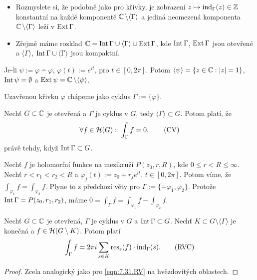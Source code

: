 \begin{note}
\begin{itemize}
    \item Rozmyslete si, že podobně jako pro křivky, je zobrazení $z\mapsto\operatorname{ind}_\Gamma(z)\in\operatorname{\mathbb{Z}}$ konstantní na každé komponentě $\operatorname{\mathbb{C}} \setminus\langle\Gamma\rangle$ a jediná neomezená komponenta $\operatorname{\mathbb{C}} \setminus\langle\Gamma\rangle$ leží v $\operatorname{Ext}\Gamma$.
    \item Zřejmě máme rozklad $\operatorname{\mathbb{C}} =\operatorname{Int}\Gamma\cup\langle\Gamma\rangle\cup\operatorname{Ext} \Gamma$, kde $\operatorname{Int} \Gamma$, $\operatorname{Ext} \Gamma$ jsou otevřené a $\langle\Gamma\rangle$, $\operatorname{Int} \Gamma\cup\langle\Gamma\rangle$ jsou kompaktní.
\end{itemize}
\end{note}

\begin{example}
Je-li $\psi:=\varphi\dotminus\varphi$, $\varphi(t):=e^{it}$, pro $t\in[0,2\pi]$. Potom $\langle\psi\rangle=\{z\in\operatorname{\mathbb{C}} : |z|=1\}$, $\operatorname{Int}\psi=\emptyset$ a $\operatorname{Ext}\psi=\operatorname{\mathbb{C}} \setminus\langle\psi\rangle$.
\end{example}

\begin{note}
Uzavřenou křivku $\varphi$ chápeme jako cyklus $\Gamma:=\{\varphi\}$.
\end{note}

\begin{theorem}\label{thm:obCapC}
Nechť $G\subset\operatorname{\mathbb{C}} $ je otevřená a $\Gamma$ je cyklus v $G$, tedy $\langle\Gamma\rangle\subset G$. Potom platí, že
\begin{equation}
    \forall f\in\Holo(G):\ \int_\Gamma f =0,
    \tag{CV}
    \label{eqn:7.30.cv}
\end{equation}
právě tehdy, když $\operatorname{Int}\Gamma\subset G$.
\end{theorem}

\begin{example}
Nechť $f$ je holomorfní funkce na mezikruží $P(z_0,r,R)$, kde $0\leq r<R\leq\infty$. Nechť $r<r_1<r_2<R$ a $\varphi_j(t):=z_0+r_je^{it}$, $t\in[0,2\pi]$. Potom víme, že $\int_{\varphi_1}f=\int_{\varphi_2}f$. Plyne to z předchozí věty pro $\Gamma:=\{\dotminus\varphi_1,\varphi_2\}$. Protože $\operatorname{Int}\Gamma=P(z_0,r_1,r_2)$, máme $0=\int_\Gamma f = \int_{\varphi_1}f-\int_{\varphi_2}f$.
\end{example}

\begin{theorem}
Nechť $G\subset\operatorname{\mathbb{C}}$ je otevřená, $\Gamma$ je cyklus v $G$ a $\operatorname{Int}\Gamma\subset G$. Nechť $K\subset G\setminus\langle\Gamma\rangle$ je konečná  a $f\in\operatorname{\mathcal{H}}(G\setminus K)$. Potom platí
\begin{equation}
    \int_\Gamma f = 2\pi i  \sum_{s\in K}\text{res}_s(f)\cdot\operatorname{ind}_\Gamma(s).
    \tag{RVC}
    \label{eqn:9.8.rvc}
\end{equation}
\end{theorem}
\begin{proof}
Zcela analogický jako pro \cref{eqn:7.31.RV} na hvězdovitých oblastech.
\end{proof}
